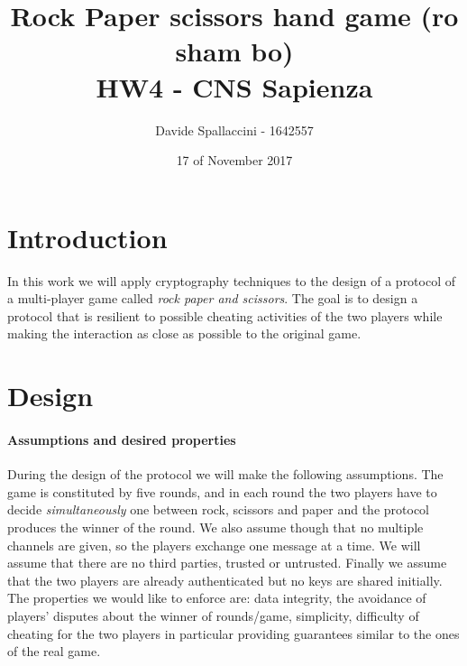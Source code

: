 \documentclass[11pt]{article}
\begin{document}
\title{Rock Paper scissors hand game (ro sham bo)\\ HW4 - CNS Sapienza}
\author{Davide Spallaccini - 1642557}
\date{17 of November 2017}
\maketitle

\section{Introduction}
In this work we will apply cryptography techniques to the design of a protocol of a multi-player game called \textit{rock paper and scissors}. The goal is to design a protocol that is resilient to possible cheating activities of the two players while making the interaction as close as possible to the original game.

\section{Design}

\paragraph*{Assumptions and desired properties}
During the design of the protocol we will make the following assumptions. The game is constituted by five rounds, and in each round the two players have to decide \textit{simultaneously} one between rock, scissors and paper and the protocol produces the winner of the round. We also assume though that no multiple channels are given, so the players exchange one message at a time. We will assume that there are no third parties, trusted or untrusted. Finally we assume that the two players are already authenticated but no keys are shared initially. The properties we would like to enforce are: data integrity, the avoidance of players' disputes about the winner of rounds/game, simplicity, difficulty of cheating for the two players in particular providing guarantees similar to the ones of the real game.
\end{document}
